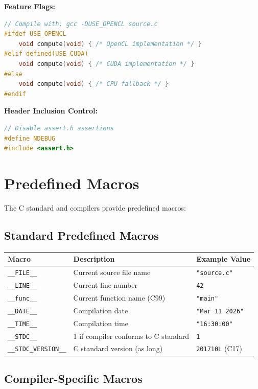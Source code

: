 \textbf{Feature Flags:}

\begin{lstlisting}[language=C]
// Compile with: gcc -DUSE_OPENCL source.c
#ifdef USE_OPENCL
    void compute(void) { /* OpenCL implementation */ }
#elif defined(USE_CUDA)
    void compute(void) { /* CUDA implementation */ }
#else
    void compute(void) { /* CPU fallback */ }
#endif
\end{lstlisting}

\textbf{Header Inclusion Control:}

\begin{lstlisting}[language=C]
// Disable assert.h assertions
#define NDEBUG
#include <assert.h>
\end{lstlisting}

\section{Predefined Macros}

The C standard and compilers provide predefined macros:

\subsection{Standard Predefined Macros}

\begin{tabular}{|l|l|p{8cm}|}
\hline
\textbf{Macro} & \textbf{Description} & \textbf{Example Value} \\
\hline
\texttt{\_\_FILE\_\_} & Current source file name & \texttt{"source.c"} \\
\hline
\texttt{\_\_LINE\_\_} & Current line number & \texttt{42} \\
\hline
\texttt{\_\_func\_\_} & Current function name (C99) & \texttt{"main"} \\
\hline
\texttt{\_\_DATE\_\_} & Compilation date & \texttt{"Mar 11 2026"} \\
\hline
\texttt{\_\_TIME\_\_} & Compilation time & \texttt{"16:30:00"} \\
\hline
\texttt{\_\_STDC\_\_} & 1 if compiler conforms to C standard & \texttt{1} \\
\hline
\texttt{\_\_STDC\_VERSION\_\_} & C standard version (as long) & \texttt{201710L} (C17) \\
\hline
\end{tabular}

\subsection{Compiler-Specific Macros}

